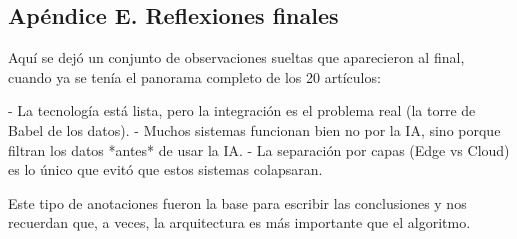 \subsection*{Apéndice E. Reflexiones finales}

Aquí se dejó un conjunto de observaciones sueltas que aparecieron al final, cuando ya se tenía el panorama completo de los 20 artículos:

- La tecnología está lista, pero la integración es el problema real (la torre de Babel de los datos).  
- Muchos sistemas funcionan bien no por la IA, sino porque filtran los datos *antes* de usar la IA.  
- La separación por capas (Edge vs Cloud) es lo único que evitó que estos sistemas colapsaran.

Este tipo de anotaciones fueron la base para escribir las conclusiones y nos recuerdan que, a veces, la arquitectura es más importante que el algoritmo.